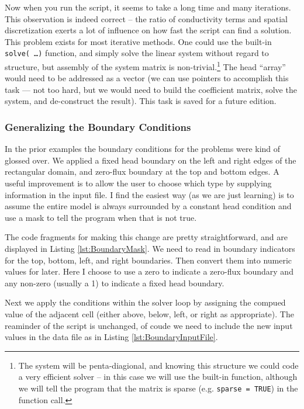 Now when you run the script, it seems to take a long time and many iterations.  
This observation is indeed correct -- the ratio of conductivity terms and spatial discretization exerts a lot of influence on how fast the script can find a solution.
This problem exists for most iterative methods.  One could use the built-in \texttt{solve( \dots )} function, and simply solve the linear system without regard to structure, but assembly of the system matrix is non-trivial.\footnote{The system will be penta-diagional, and knowing this structure we could code a very efficient solver -- in this case we will use the built-in function, although we will tell the program that the matrix is sparse (e.g. \texttt{sparse = TRUE}) in the function call.}  
The head ``array'' would need to be addressed as a vector (we can use pointers to accomplish this task --- not too hard, but we would need to build the coefficient matrix, solve the system, and de-construct the result).   This task is saved for a future edition.

\subsubsection{Generalizing the Boundary Conditions}
In the prior examples the boundary conditions for the problems were kind of glossed over.
We applied a fixed head boundary on the left and right edges of the rectangular domain, and zero-flux boundary at the top and bottom edges.
A useful improvement is to allow the user to choose which type by supplying information in the input file.
I find the easiest way (as we are just learning) is to assume the entire model is always surrounded by a constant head condition and use a mask to tell the program when that is not true.  

The code fragments for making this change are pretty straightforward, and are displayed in Listing \ref{lst:BoundaryMask}.
We need to read in boundary indicators for the top, bottom, left, and right boundaries.  
Then convert them into numeric values for later.
Here I choose to use a zero to indicate a zero-flux boundary and any non-zero (usually a 1) to indicate a fixed head boundary.

Next we apply the conditions within the solver loop by assigning the compued value of the adjacent cell (either above, below, left, or right as appropriate).   
The reaminder of the script is unchanged, of coude we need to include the new input values in the data file as in Listing \ref{lst:BoundaryInputFile}.


